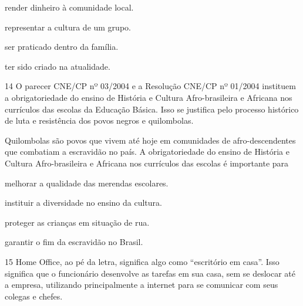 \begin{minipage}{0.5\textwidth}
\begin{escolha}
\item render dinheiro à comunidade local.

\item representar a cultura de um grupo.

\item ser praticado dentro da família.

\item ter sido criado na atualidade.
\end{escolha}
\end{minipage}


\num{14} O parecer CNE/CP nº 03/2004 e a Resolução CNE/CP nº 01/2004 instituem a
obrigatoriedade do ensino de História e Cultura Afro-brasileira e
Africana nos currículos das escolas da Educação
Básica. Isso se justifica pelo processo histórico de luta e
resistência dos povos negros e quilombolas.


\noindent{}Quilombolas são povos que vivem até hoje em comunidades de
afro-descendentes que combatiam a escravidão no país. A
obrigatoriedade do ensino de História e Cultura Afro-brasileira e
Africana nos currículos das escolas é importante para

\begin{escolha}
\item melhorar a qualidade das merendas escolares.

\item instituir a diversidade no ensino da cultura.

\item proteger as crianças em situação de rua.

\item garantir o fim da escravidão no Brasil.
\end{escolha}


\num{15} Home Office, ao pé da letra, significa algo como “escritório em casa”. Isso significa que o
funcionário desenvolve as tarefas em sua casa, sem se
deslocar até a empresa,
utilizando principalmente a internet para se comunicar com seus colegas e chefes.

